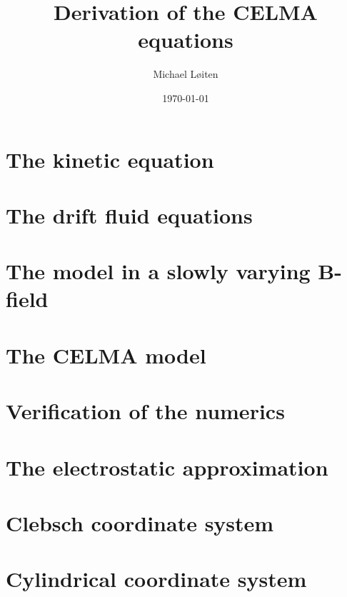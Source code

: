 \documentclass[12pt,a4paper,oneside,openright]{report} %
\title{\vspace{-8ex}Derivation of the CELMA equations\vspace{-1ex}}
\author{Michael L{\o}iten}
\date{\vspace{-2ex}\today}
\begin{document}
\maketitle

\chapter{The kinetic equation}

%
\chapter{The drift fluid equations}
\label{chap:drift-order}


\chapter{The model in a slowly varying B-field}


\chapter{The CELMA model}


%
%
\chapter{Verification of the numerics}
\label{app:verification}


\appendix

\chapter{The electrostatic approximation}
\label{app:elstat}


\chapter{Clebsch coordinate system}
\label{app:Clebsch}


\chapter{Cylindrical coordinate system}
\label{app:cylcoord}

\end{document}
